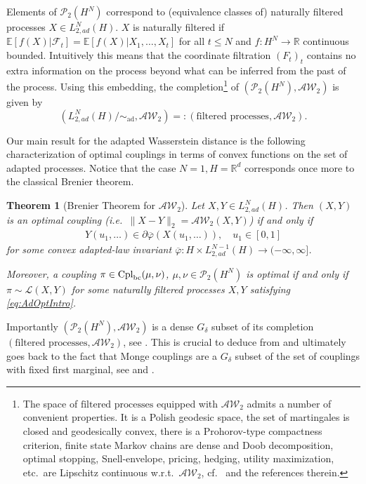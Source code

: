 \documentclass[a4paper]{amsart}
\newtheorem{theorem}{Theorem}
\numberwithin{theorem}{section}
\theoremstyle{definition}
\newcommand{\R}{\mathbb{R}}
\newcommand{\E}{\mathbb{E}}
\newcommand{\F}{\mathcal{F}}
\newcommand{\law}{\mathcal{L}}
\newcommand{\cpl}{\textup{Cpl}}
\newcommand{\AW}{\mathcal{AW}}
\newcommand{\Pc}{\mathcal P}
\newcommand{\cplbc}{\cpl_{\rm bc}}
\newcommand{\simad}{\sim_{\mathrm{ad}}}
\renewcommand{\H}{H}
\renewcommand{\phi}{\varphi}
\begin{document}
Elements of $\Pc_2(\H^N)$ correspond to (equivalence classes of) naturally filtered processes $X\in L_{2,ad}^N(\H)$. $X$ is naturally filtered if
    $\E[f(X)|\F_t] = \E[f(X)|X_1, \ldots, X_t]$  
for all $t\leq N$ and $f: \H^N\to \R$ continuous bounded. Intuitively this means that the coordinate filtration $(F_t)_t$ contains no extra information on the process beyond what can be inferred from the past of the process.
Using this embedding, the completion\footnote{The space of  $\text{filtered processes}$ equipped with $ \AW_2$ admits a number of convenient properties. It is a Polish geodesic space,  
the set of martingales is closed and geodesically convex, there is a Prohorov-type compactness criterion, 
 finite state Markov chains are dense and Doob decomposition, optimal stopping, Snell-envelope, pricing, hedging, utility maximization, etc.\  are Lipschitz continuous w.r.t.\ $\AW_2$, cf.\ \cite{BaBePa21} and the references therein.} of  $(\Pc_2(\H^N),\AW_2)$ is given by
$$(L_{2,ad}^N(\H) / \simad, \AW_2)=:(\text{filtered processes},\AW_2).$$ 



Our main result for the adapted Wasserstein distance is the following characterization of optimal couplings in terms of convex functions on the set of adapted processes. Notice that the case $N=1, \H= \R^d$ corresponds once more to the classical Brenier theorem.  
\begin{theorem}[Brenier Theorem for $\AW_2$]\label{thm:AW_Brenier_Intro}
    Let $X,Y\in L_{2, ad}^N(\H)$. Then $(X,Y)$ is an optimal coupling (i.e.\ $\|X-Y\|_2=\AW_2(X,Y)$) if and only if 
    \begin{align}\label{eq:AdOptIntro} 
    Y(u_1, \ldots) \in \partial \overline{\phi}( X(u_1, \ldots)),\quad u_1\in [0,1]
    \end{align}
    for some convex adapted-law invariant $\overline{\phi}: \H\times L_{2, ad}^{N-1}(H)\to (-\infty, \infty]$.

    Moreover, a coupling $\pi \in \cplbc(\mu, \nu)$, $\mu, \nu\in \Pc_2(H^N)$ is optimal if and only if $\pi \sim \law(X,Y)$ for some naturally filtered processes $X,Y$ satisfying \eqref{eq:AdOptIntro}. 
\end{theorem}
Importantly $(\Pc_2(\H^N),\AW_2)$ is a dense $G_\delta$ subset of its completion  $(\text{filtered processes},\AW_2)$, see \cite{Ed19, BaBeEdPi17}.  This is crucial to deduce  from   and ultimately goes back to the fact that Monge couplings are a $G_\delta$ subset of the set of couplings with fixed first marginal, see \cite{MeZh84} and \cite[IV, 43]{DeMeB}.  
\end{document}
